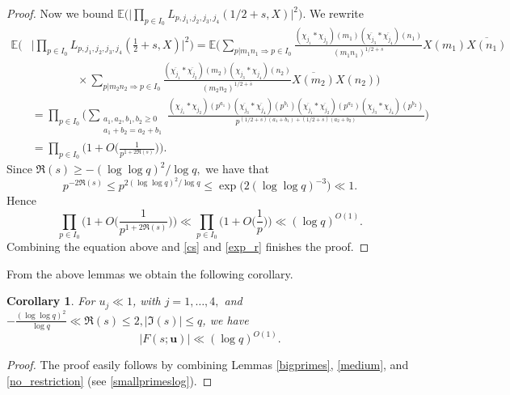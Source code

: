 \documentclass[12pt, reqno]{amsart}
\newcommand{\E}{\mathbb{E}}
\newtheorem{corollary}[theorem]{Corollary}
\numberwithin{equation}{section}
\numberwithin{theorem}{section}
\numberwithin{equation}{section}
\begin{document}
\begin{proof}
 Now we bound $\E \Big( \big| \prod_{p \in I_0} L_{p,j_1,j_2,j_3,j_4}( 1/2+s,X )\big|^2\Big) $. We rewrite
 \begin{align*}
    \E \Bigg( & \bigg| \prod_{p \in I_0} L_{p,j_1,j_2,j_3,j_4} ( \tfrac{1}{2}+s,X )\bigg|^2\Bigg) = \E \Bigg(  \sum_{p|m_1n_1 \Rightarrow p \in I_0} \frac{ (\chi_{j_1} * \chi_{j_2})(m_1) (\overline{\chi_{j_3}} * \overline{\chi_{j_4}})(n_1)}{(m_1n_1)^{1/2+s}} X(m_1) \overline{X(n_1)} \\
    & \qquad\qquad\times \sum_{p|m_2n_2 \Rightarrow p \in I_0} \frac{ (\overline{\chi_{j_1}} * \overline{\chi_{j_2}})(m_2) (\chi_{j_3} * \chi_{j_4})(n_2)}{(m_2n_2)^{1/2+\overline{s}}} \overline{X(m_2)} X(n_2)\Bigg)  \\
    & = \prod_{p \in I_0} \bigg(  \sum_{\substack{a_1,a_2,b_1,b_2 \geq 0 \\ a_1+b_2=a_2+b_1}} \frac{(\chi_{j_1} * \chi_{j_2})(p^{a_1}) (\overline{\chi_{j_3}} * \overline{\chi_{j_4}})(p^{b_1}) (\overline{\chi_{j_1}} * \overline{\chi_{j_2}})(p^{a_2})(\chi_{j_3} * \chi_{j_4})(p^{b_2})}{p^{(1/2+s)(a_1+b_1)+(1/2+\overline{s})(a_2+b_2)}}\bigg) \\
    &= \prod_{p \in I_0} \bigg(1+ O \Big( \frac{1}{p^{1+2\Re(s)}} \Big) \bigg).
 \end{align*}
 Since $\Re(s) \geq - (\log \log q)^2/\log q,$ we have that 
 $$p^{-2\Re(s)} \leq p^{2(\log \log q)^2/\log q} \leq \exp \big( 2 (\log \log q)^{-3}\big) \ll 1.$$
 Hence 
 \begin{equation}
 \label{smallprimeslog}
 \prod_{p \in I_0} \bigg(1+ O \Big( \frac{1}{p^{1+2\Re(s)}} \Big) \bigg) \ll \prod_{p \in I_0} \bigg(1+ O \Big( \frac{1}{p}  \Big) \bigg) \ll (\log q)^{O(1)}.
 \end{equation}
 Combining the equation above and \eqref{cs} and \eqref{exp_r} finishes the proof. 
\end{proof}

From the above lemmas we obtain the following corollary.

\begin{corollary}
\label{fs_bound}
    For $u_j \ll 1$, with $j=1,\ldots,4,$ and $- \frac{(\log \log q)^2}{\log q} \ll \Re(s) \leq 2, |\Im(s)| \leq q$, we have
    $$|F(s;\textbf{u})| \ll (\log q)^{O(1)}.$$
\end{corollary}
\begin{proof}
    The proof easily follows by combining Lemmas \ref{bigprimes}, \ref{medium}, and \ref{no_restriction} (see \eqref{smallprimeslog}).
\end{proof}
\end{document}
